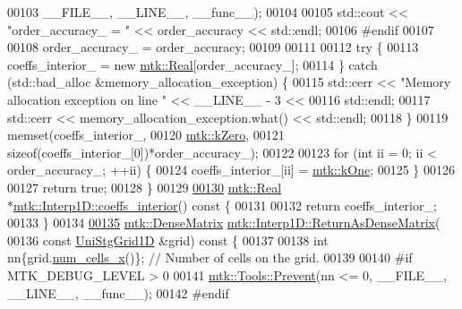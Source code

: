 \begin{DoxyCode}
00103                       \_\_FILE\_\_, \_\_LINE\_\_, \_\_func\_\_);
00104 
00105   std::cout << \textcolor{stringliteral}{"order\_accuracy\_ = "} << order\_accuracy << std::endl;
00106 \textcolor{preprocessor}{  #endif}
00107 
00108   order\_accuracy\_ = order\_accuracy;
00109 
00111 
00112   \textcolor{keywordflow}{try} \{
00113     coeffs\_interior\_ = \textcolor{keyword}{new} \hyperlink{group__c01-roots_gac080bbbf5cbb5502c9f00405f894857d}{mtk::Real}[order\_accuracy\_];
00114   \} \textcolor{keywordflow}{catch} (std::bad\_alloc &memory\_allocation\_exception) \{
00115     std::cerr << \textcolor{stringliteral}{"Memory allocation exception on line "} << \_\_LINE\_\_ - 3 <<
00116       std::endl;
00117     std::cerr << memory\_allocation\_exception.what() << std::endl;
00118   \}
00119   memset(coeffs\_interior\_,
00120          \hyperlink{group__c01-roots_ga59a451a5fae30d59649bcda274fea271}{mtk::kZero},
00121          \textcolor{keyword}{sizeof}(coeffs\_interior\_[0])*order\_accuracy\_);
00122 
00123   \textcolor{keywordflow}{for} (\textcolor{keywordtype}{int} ii = 0; ii < order\_accuracy\_; ++ii) \{
00124     coeffs\_interior\_[ii] = \hyperlink{group__c01-roots_ga26407c24d43b6b95480943340d285c71}{mtk::kOne};
00125   \}
00126 
00127   \textcolor{keywordflow}{return} \textcolor{keyword}{true};
00128 \}
00129 
\hypertarget{mtk__interp__1d_8cc_source_l00130}{}\hyperlink{classmtk_1_1Interp1D_a652289cbb0000d3f4e5e8d632aaf4b03}{00130} \hyperlink{group__c01-roots_gac080bbbf5cbb5502c9f00405f894857d}{mtk::Real} *\hyperlink{classmtk_1_1Interp1D_a652289cbb0000d3f4e5e8d632aaf4b03}{mtk::Interp1D::coeffs\_interior}()\textcolor{keyword}{ const }\{
00131 
00132   \textcolor{keywordflow}{return} coeffs\_interior\_;
00133 \}
00134 
\hypertarget{mtk__interp__1d_8cc_source_l00135}{}\hyperlink{classmtk_1_1Interp1D_aee8126b8a4be378a30be4d95b43b384b}{00135} \hyperlink{classmtk_1_1DenseMatrix}{mtk::DenseMatrix} \hyperlink{classmtk_1_1Interp1D_aee8126b8a4be378a30be4d95b43b384b}{mtk::Interp1D::ReturnAsDenseMatrix}(
00136   \textcolor{keyword}{const} \hyperlink{classmtk_1_1UniStgGrid1D}{UniStgGrid1D} &grid)\textcolor{keyword}{ const }\{
00137 
00138   \textcolor{keywordtype}{int} nn\{grid.\hyperlink{classmtk_1_1UniStgGrid1D_af1b3729d8afa07be5b2775ed68015b80}{num\_cells\_x}()\}; \textcolor{comment}{// Number of cells on the grid.}
00139 
00140 \textcolor{preprocessor}{  #if MTK\_DEBUG\_LEVEL > 0}
00141   \hyperlink{classmtk_1_1Tools_afe5bb096309258e2e72503fd7b41c7e0}{mtk::Tools::Prevent}(nn <= 0, \_\_FILE\_\_, \_\_LINE\_\_, \_\_func\_\_);
00142 \textcolor{preprocessor}{  #endif}

\end{DoxyCode}

